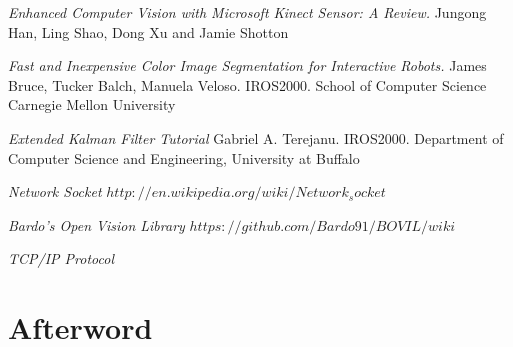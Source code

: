 \documentclass{book} %
\begin{document}
\begin{thebibliography}{9}
 \textit{Enhanced Computer Vision with Microsoft Kinect Sensor: A Review.} Jungong Han, Ling Shao, Dong Xu and Jamie Shotton

 \textit{Fast and Inexpensive Color Image Segmentation for Interactive Robots.} James Bruce, Tucker Balch, Manuela Veloso. IROS2000. School of Computer Science Carnegie Mellon University

 \textit{Extended Kalman Filter Tutorial} Gabriel A. Terejanu. IROS2000. Department of Computer Science and Engineering, University at Buffalo

 \textit{Network Socket} $http://en.wikipedia.org/wiki/Network_socket$

 \textit{Bardo's Open Vision Library} $https://github.com/Bardo91/BOVIL/wiki$

 \textit{TCP/IP Protocol} 

\end{thebibliography}

\backmatter

\chapter{Afterword}
\end{document}
